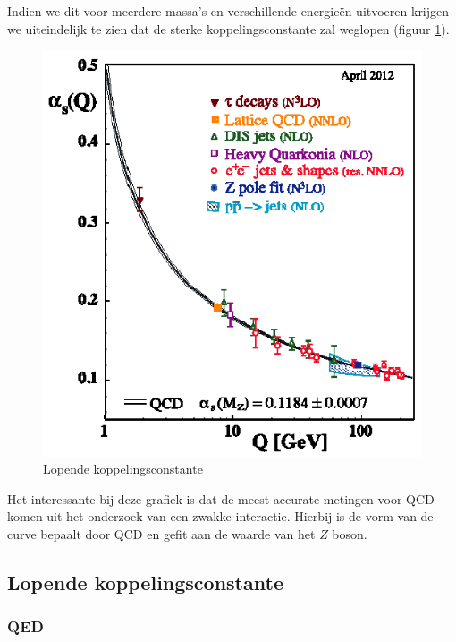 \documentclass[../main.tex]{subfiles}
\begin{document}
Indien we dit voor meerdere massa's en verschillende energieën uitvoeren krijgen we uiteindelijk te zien dat de sterke koppelingsconstante zal weglopen (figuur \ref{fig:running_str_kop}).

\begin{figure}[h]
    \centering
    \includegraphics[width=0.6\linewidth]{QCD/running_str_kop.png}
    \caption{Lopende koppelingsconstante}%
    \label{fig:running_str_kop}
\end{figure}

Het interessante bij deze grafiek is dat de meest accurate metingen voor QCD komen uit het onderzoek van een zwakke interactie. Hierbij is de vorm van de curve bepaalt door QCD en gefit aan de waarde van het $Z$ boson.

\subsection{Lopende koppelingsconstante}%
\label{sub:lopende_koppelingsconstante}

\subsubsection{QED}%
\label{ssub:qed}
\end{document}
